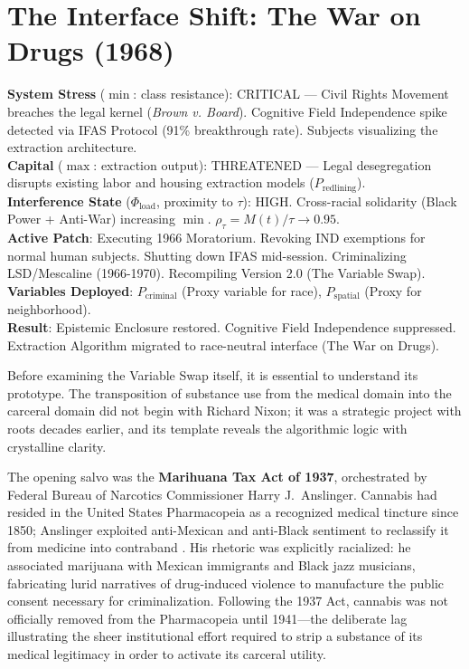 \documentclass[12pt,openany]{book}
\begin{document}
\section{The Interface Shift: The War on Drugs (1968)}

\begin{tcolorbox}[colback=black!5, colframe=black!70, fonttitle=\bfseries\ttfamily, title=RUNTIME LOG: 1966 (SECURITY PATCH)]
\ttfamily\small
\textbf{System Stress} ($\min$: class resistance): CRITICAL --- Civil Rights Movement breaches the legal kernel (\textit{Brown v. Board}). Cognitive Field Independence spike detected via IFAS Protocol (91\% breakthrough rate). Subjects visualizing the extraction architecture.\\
\textbf{Capital} ($\max$: extraction output): THREATENED --- Legal desegregation disrupts existing labor and housing extraction models ($P_{\text{redlining}}$).\\
\textbf{Interference State} ($\Phi_{\text{load}}$, proximity to $\tau$): HIGH. Cross-racial solidarity (Black Power + Anti-War) increasing $\min$. $\rho_{\tau}=M(t)/\tau \rightarrow 0.95$.\\
\textbf{Active Patch}: Executing 1966 Moratorium. Revoking IND exemptions for normal human subjects. Shutting down IFAS mid-session. Criminalizing LSD/Mescaline (1966-1970). Recompiling Version 2.0 (The Variable Swap).\\
\textbf{Variables Deployed}: $P_{\text{criminal}}$ (Proxy variable for race), $P_{\text{spatial}}$ (Proxy for neighborhood).\\
\textbf{Result}: Epistemic Enclosure restored. Cognitive Field Independence suppressed. Extraction Algorithm migrated to race-neutral interface (The War on Drugs).
\end{tcolorbox}

Before examining the Variable Swap itself, it is essential to understand its prototype. The transposition of substance use from the medical domain into the carceral domain did not begin with Richard Nixon; it was a strategic project with roots decades earlier, and its template reveals the algorithmic logic with crystalline clarity.

The opening salvo was the \textbf{Marihuana Tax Act of 1937}, orchestrated by Federal Bureau of Narcotics Commissioner Harry J.\ Anslinger. Cannabis had resided in the United States Pharmacopeia as a recognized medical tincture since 1850; Anslinger exploited anti-Mexican and anti-Black sentiment to reclassify it from medicine into contraband \cite{bonnie}. His rhetoric was explicitly racialized: he associated marijuana with Mexican immigrants and Black jazz musicians, fabricating lurid narratives of drug-induced violence to manufacture the public consent necessary for criminalization. Following the 1937 Act, cannabis was not officially removed from the Pharmacopeia until 1941---the deliberate lag illustrating the sheer institutional effort required to strip a substance of its medical legitimacy in order to activate its carceral utility.
\end{document}
